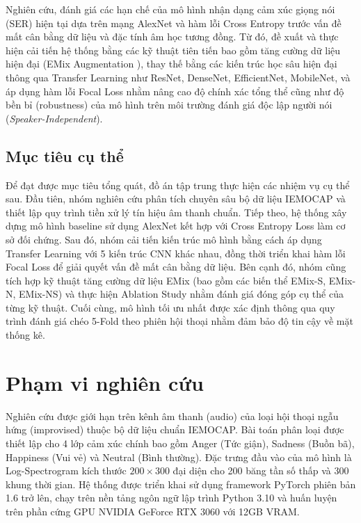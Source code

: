 Nghiên cứu, đánh giá các hạn chế của mô hình nhận dạng cảm xúc giọng nói (SER) hiện tại dựa trên mạng AlexNet và hàm lỗi Cross Entropy trước vấn đề mất cân bằng dữ liệu và đặc tính âm học tương đồng. Từ đó, đề xuất và thực hiện cải tiến hệ thống bằng các kỹ thuật tiên tiến bao gồm tăng cường dữ liệu hiện đại (EMix Augmentation \cite{dang2023emix}), thay thế bằng các kiến trúc học sâu hiện đại thông qua Transfer Learning như ResNet, DenseNet, EfficientNet, MobileNet, và áp dụng hàm lỗi Focal Loss nhằm nâng cao độ chính xác tổng thể cũng như độ bền bỉ (robustness) của mô hình trên môi trường đánh giá độc lập người nói (\textit{Speaker-Independent}).

\subsection{Mục tiêu cụ thể}

Để đạt được mục tiêu tổng quát, đồ án tập trung thực hiện các nhiệm vụ cụ thể sau. Đầu tiên, nhóm nghiên cứu phân tích chuyên sâu bộ dữ liệu IEMOCAP và thiết lập quy trình tiền xử lý tín hiệu âm thanh chuẩn. Tiếp theo, hệ thống xây dựng mô hình baseline sử dụng AlexNet kết hợp với Cross Entropy Loss làm cơ sở đối chứng. Sau đó, nhóm cải tiến kiến trúc mô hình bằng cách áp dụng Transfer Learning với 5 kiến trúc CNN khác nhau, đồng thời triển khai hàm lỗi Focal Loss để giải quyết vấn đề mất cân bằng dữ liệu. Bên cạnh đó, nhóm cũng tích hợp kỹ thuật tăng cường dữ liệu EMix \cite{dang2023emix} (bao gồm các biến thể EMix-S, EMix-N, EMix-NS) và thực hiện Ablation Study nhằm đánh giá đóng góp cụ thể của từng kỹ thuật. Cuối cùng, mô hình tối ưu nhất được xác định thông qua quy trình đánh giá chéo 5-Fold theo phiên hội thoại nhằm đảm bảo độ tin cậy về mặt thống kê.

\section{Phạm vi nghiên cứu}
\label{sec:scope}

Nghiên cứu được giới hạn trên kênh âm thanh (audio) của loại hội thoại ngẫu hứng (improvised) thuộc bộ dữ liệu chuẩn IEMOCAP. Bài toán phân loại được thiết lập cho 4 lớp cảm xúc chính bao gồm Anger (Tức giận), Sadness (Buồn bã), Happiness (Vui vẻ) và Neutral (Bình thường). Đặc trưng đầu vào của mô hình là Log-Spectrogram kích thước $200 \times 300$ đại diện cho 200 băng tần số thấp và 300 khung thời gian. Hệ thống được triển khai sử dụng framework PyTorch phiên bản 1.6 trở lên, chạy trên nền tảng ngôn ngữ lập trình Python 3.10 và huấn luyện trên phần cứng GPU NVIDIA GeForce RTX 3060 với 12GB VRAM.

